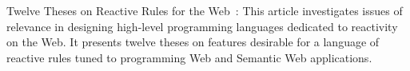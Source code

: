 Twelve Theses on Reactive Rules for the Web~\cite{10.1007-11896548_63}:
This article investigates issues of relevance in designing high-level
programming languages dedicated to reactivity on the Web. It presents
twelve theses on features desirable for a language of reactive rules tuned
to programming Web and Semantic Web applications.



